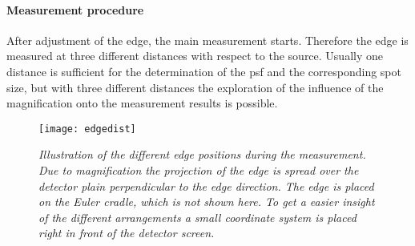 \paragraph{Measurement procedure}
After adjustment of the edge, the main measurement starts. Therefore the edge is measured at three different distances with respect to the source. Usually one distance is sufficient for the determination of the \gls{psf} and the corresponding spot size, but with three different distances the exploration of the influence of the magnification onto the measurement results is possible. 
\begin{figure}%
	\begin{center}
		\texttt{[image: edgedist]}
	\end{center}
	\caption[Illustration of the different edge positions for the measurement]{\textit{Illustration of the different edge positions during the measurement. Due to magnification the projection of the edge is spread over the detector plain perpendicular to the edge direction. The edge is placed on the Euler cradle, which is not shown here. To get a easier insight of the different arrangements a small coordinate system is placed right in front of the detector screen. }}
	\label{edgedist}
\end{figure}
